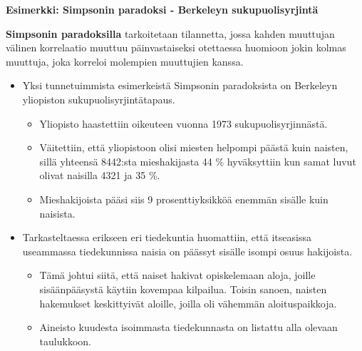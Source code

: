 \documentclass[
]{book}
\providecommand{\tightlist}{%
  \setlength{\itemsep}{0pt}\setlength{\parskip}{0pt}}
\begin{document}
\FloatBarrier

\newpage

\begin{defblock}{}

\textbf{Esimerkki: Simpsonin paradoksi - Berkeleyn sukupuolisyrjintä}

\textbf{Simpsonin paradoksilla} tarkoitetaan tilannetta, jossa kahden muuttujan välinen korrelaatio muuttuu päinvastaiseksi otettaessa huomioon jokin kolmas muuttuja, joka korreloi molempien muuttujien kanssa.

\begin{itemize}
\tightlist
\item
  Yksi tunnetuimmista esimerkeistä Simpsonin paradoksista on Berkeleyn yliopiston sukupuolisyrjintätapaus.

  \begin{itemize}
  \tightlist
  \item
    Yliopisto haastettiin oikeuteen vuonna 1973 sukupuolisyrjinnästä.
  \item
    Väitettiin, että yliopistoon olisi miesten helpompi päästä kuin naisten, sillä yhteensä 8442:sta mieshakijasta 44 \% hyväksyttiin kun samat luvut olivat naisilla 4321 ja 35 \%.
  \item
    Mieshakijoista pääsi siis 9 prosenttiyksikköä enemmän sisälle kuin naisista.
  \end{itemize}
\item
  Tarkasteltaessa erikseen eri tiedekuntia huomattiin, että itseasissa useammassa tiedekunnissa naisia on päässyt sisälle isompi osuus hakijoista.

  \begin{itemize}
  \tightlist
  \item
    Tämä johtui siitä, että naiset hakivat opiskelemaan aloja, joille sisäänpääsystä käytiin kovempaa kilpailua. Toisin sanoen, naisten hakemukset keskittyivät aloille, joilla oli vähemmän aloituspaikkoja.
  \item
    Aineisto kuudesta isoimmasta tiedekunnasta on listattu alla olevaan taulukkoon.
  \end{itemize}
\end{itemize}

\end{defblock}

\FloatBarrier
\end{document}
